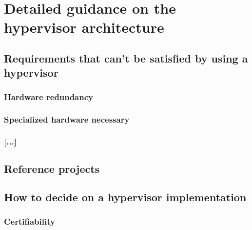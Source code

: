
\chapter{Detailed guidance on the hypervisor architecture} %

\label{Chapter5} %


\newcommand{\keyword}[1]{\textbf{#1}}
\newcommand{\tabhead}[1]{\textbf{#1}}
\newcommand{\code}[1]{\texttt{#1}}
\newcommand{\file}[1]{\texttt{\bfseries#1}}
\newcommand{\option}[1]{\texttt{\itshape#1}}


\section{Requirements that can't be satisfied by using a hypervisor}
\subsection{Hardware redundancy}
\subsection{Specialized hardware necessary}
\subsection{[...]}


\section{Reference projects}


\section{How to decide on a hypervisor implementation}
\subsection{Certifiability}
